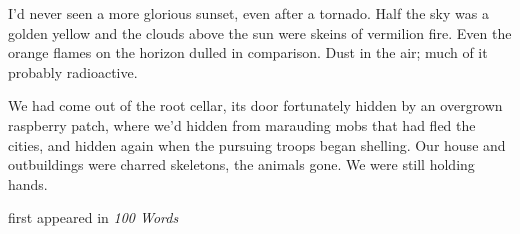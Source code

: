 I'd never seen a more glorious sunset, even after a tornado. Half the
sky was a golden yellow and the clouds above the sun were skeins of
vermilion fire. Even the orange flames on the horizon dulled in
comparison. Dust in the air; much of it probably radioactive.

We had come out of the root cellar, its door fortunately hidden by an
overgrown raspberry patch, where we'd hidden from marauding mobs that
had fled the cities, and hidden again when the pursuing troops began
shelling. Our house and outbuildings were charred skeletons, the animals
gone. We were still holding hands.

first appeared in \emph{100 Words}
